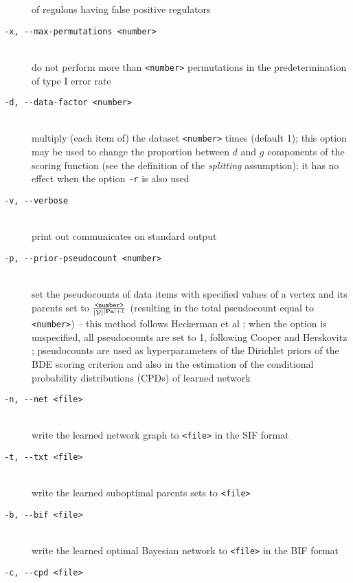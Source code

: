 \begin{description}
 of regulons having false positive regulators
\item[\texttt{-x, -\hspace{0pt}-max-permutations <number>}]~\\
 do not perform more than \texttt{<number>} permutations 
 in the predetermination of type I error rate
\item[\texttt{-d, -\hspace{0pt}-data-factor <number>}]~\\
 multiply (each item of) the dataset \texttt{<number>} times (default 1); 
 this option may be used to change the proportion between $d$ and $g$ components 
 of the scoring function (see the definition of the \emph{splitting} assumption);
 it has no effect when the option \texttt{-r} is also used
\item[\texttt{-v, -\hspace{0pt}-verbose}]~\\
 print out communicates on standard output %
\item[\texttt{-p, -\hspace{0pt}-prior-pseudocount <number>}]~\\
 set the pseudocounts of data items with specified values of a vertex and its parents set 
 to $\frac{\texttt{<number>}}{|\mathcal{V}|^{|\mathbf{Pa}|+1}}$ 
 (resulting in the total pseudocount equal to \texttt{<number>}) 
 -- this method follows Heckerman et al \cite{heckerman95}; 
 when the option is unspecified, all pseudocounts are set to 1, 
 following Cooper and Herskovitz \cite{cooper92}; 
 pseudocounts are used as hyperparameters of the Dirichlet priors 
 of the BDE scoring criterion and also in the estimation 
 of the conditional probability distributions (CPDs) of learned network
\item[\texttt{-n, -\hspace{0pt}-net <file>}]~\\
 write the learned network graph to \texttt{<file>} in the SIF format
\item[\texttt{-t, -\hspace{0pt}-txt <file>}]~\\
 write the learned suboptimal parents sets to \texttt{<file>}
\item[\texttt{-b, -\hspace{0pt}-bif <file>}]~\\
 write the learned optimal Bayesian network to \texttt{<file>} 
 in the BIF format
 \item[\texttt{-c, -\hspace{0pt}-cpd <file>}]~\\

\end{description}
